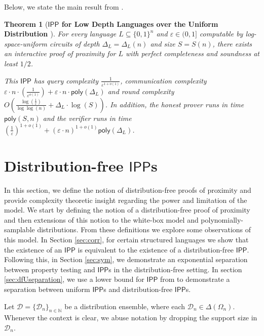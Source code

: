 \documentclass[11pt]{article}
\newtheorem{theorem}{Theorem}[section]
\newcommand{\poly}{\mathsf{poly}}
\newcommand{\IPP}{\mathsf{IPP}}
\newcommand{\N}{\mathbb{N}}
\newcommand{\sD}{\mathcal{D}}
\begin{document}
\noindent Below, we state the main result from \cite{RVW}.
\begin{theorem}[\textbf{$\IPP$ for Low Depth Languages over the Uniform Distribution \cite{RVW}}]
\label{thm:unifRVW}
For every language $L\subseteq \{0,1\}^{n}$ and $\varepsilon\in (0,1]$ computable by log-space-uniform circuits of depth $\Delta_{L}=\Delta_{L}(n)$ and size $S=S(n)$, there exists an interactive proof of proximity for $L$ with perfect completeness and soundness at least $1/2$. 

This $\IPP$ has query complexity $\frac{1}{\varepsilon ^{1+o(1)}}$, communication complexity $\varepsilon\cdot n\cdot \left(\frac{1}{\varepsilon^{o(1)}}\right)+\varepsilon\cdot n\cdot \poly(\Delta_{L})$ and round complexity $O\left(\frac{\log\left(\frac{1}{\varepsilon}\right)}{\log\log (n)}+\Delta_{L}\cdot\log (S)\right)$. In addition, the honest prover runs in time $\poly(S,n)$ and the verifier runs in time $(\frac{1}{\varepsilon})^{1+o(1)}+(\varepsilon\cdot n)^{1+o(1)} \poly(\Delta_{L})$.
\end{theorem}

\section{Distribution-free $\IPP$s}
\label{sec:dfipp_def_separations}

In this section, we define the notion of distribution-free proofs of proximity and provide complexity theoretic insight regarding the power and limitation of the model. We start by defining the notion of a distribution-free proof of proximity and then extensions of this notion to the white-box model and polynomially-samplable distributions.  From these definitions we explore some observations of this model. In Section \ref{sec:corr}, for certain structured languages we show that the existence of an $\IPP$ is equivalent to the existence of a distribution-free $\IPP$. Following this, in Section \ref{sec:sym}, we demonstrate an exponential separation between property testing and $\IPP$s in the distribution-free setting. In section \ref{sec:dfUseparation}, we use a lower bound for $\IPP$ from \cite{KR15} to demonstrate a separation between uniform $\IPP$s and distribution-free $\IPP$s.

Let $\sD = \{\sD_n\}_{n \in \N}$ be a distribution ensemble, where each $\sD_n \in \Delta(\Omega_n)$. Whenever the context is clear, we abuse notation by dropping the support size in $\sD_n$. 
\end{document}
